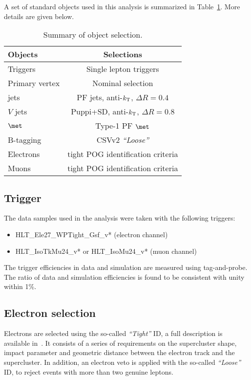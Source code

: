 A set of standard objects used in this analysis is summarized in Table~\ref{tab:objects_final}. More details are given below.  

\begin{table}[htbp]
  \begin{center}
 {\small
  \begin{tabular} {lc}
\hline
  Objects      & Selections \\
  \hline
Triggers       & Single lepton triggers  \\
Primary vertex & Nominal selection  \\
jets           & PF jets, anti-$k_{\rm T}$, $\Delta R = 0.4$  \\
$V$ jets       & Puppi+SD, anti-$k_{\rm T}$, $\Delta R = 0.8$ \\
$\met$         & Type-1 PF $\met$\\
B-tagging      & CSVv2 {\em``Loose''}  \\
Electrons      & tight POG identification criteria  \\
Muons          & tight POG identification criteria   \\
  \hline
  \end{tabular}
}
  \caption{Summary of object selection.\label{tab:objects_final}}
  \end{center}
\end{table}

\subsection{Trigger}
\label{subsec:trigger}
The data samples used in the analysis were taken with the following triggers:
\begin{itemize}
\item HLT\_Ele27\_WPTight\_Gsf\_v* (electron channel)
\item HLT\_IsoTkMu24\_v* or  HLT\_IsoMu24\_v* (muon channel)
\end{itemize}
The trigger efficiencies in data and simulation are measured using tag-and-probe. The ratio of data and simulation efficiencies is found to be consistent with unity within 1\%.


\subsection{Electron selection}
\label{subsec:electrons}
Electrons are selected using the so-called {\em ``Tight''} ID, a full description is available in~\cite{Twiki:EleID}. It consists of a series of requirements on the supercluster shape, impact parameter and geometric distance between the electron track and the supercluster. In addition, an electron veto is applied with the so-called {\em ``Loose''} ID, to reject events with more than two genuine leptons. 

